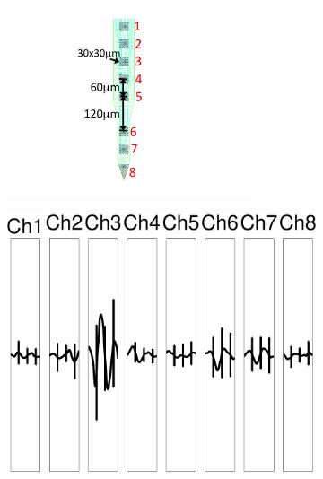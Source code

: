 \begin{center}
\begin{figure}
\begin{subfigure}[b]{.28\textwidth}
\caption{}
\label{3chpca}
\end{subfigure}
\begin{subfigure}[b]{.12\textwidth}
\includegraphics[width=0.8\textwidth]{../figs/8dev}
\caption{}
\label{3dev}
\end{subfigure}
\begin{subfigure}[b]{.28\textwidth}
\includegraphics[width=\textwidth]{../figs/8devim/clus3}
\caption{}
\label{ex81}
\end{subfigure}
\begin{subfigure}[b]{.28\textwidth}

\end{subfigure}
\end{figure}
\end{center}

